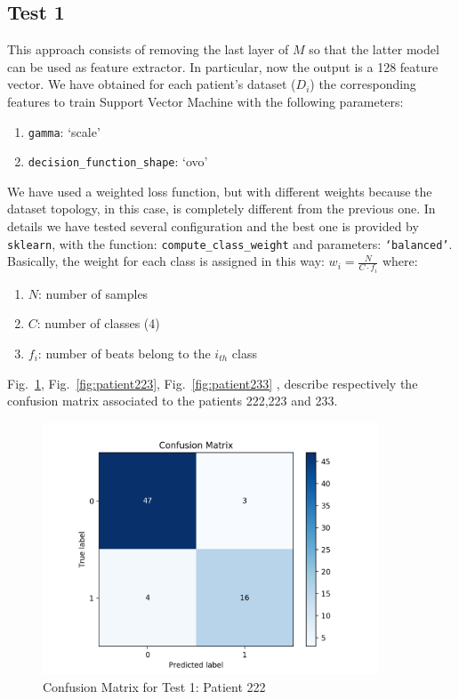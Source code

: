 \documentclass[LaM,binding=0.6cm]{sapthesis}
\begin{document}
\subsection{Test 1}
This approach consists of removing the last layer of $M$ so that the latter model can be used as  feature extractor. In particular, now the output is a 128 feature vector. We have obtained for each patient's dataset ($D_i$) the corresponding features to train Support Vector Machine with the following parameters:
\begin{enumerate}
\item \texttt{gamma}: `scale'
\item \texttt{decision\_function\_shape}: `ovo'
\end{enumerate}
We have used a weighted loss function, but with different weights because the dataset topology, in this case, is completely different from the previous one. In details we have tested several configuration and the best one is provided by \texttt{sklearn}, with the function: \texttt{compute\_class\_weight} and parameters: \texttt{`balanced'}. Basically, the weight for each class is assigned in this way: $w_i = \frac{N}{C\cdot f_i}$ where:
\begin{enumerate}
\item $N$: number of samples
\item $C$: number of classes (4)
\item $f_i$: number of beats belong to the $i_{th}$ class
\end{enumerate}
Fig.~\ref{fig:patient222}, Fig.~\ref{fig:patient223}, Fig.~\ref{fig:patient233} , describe respectively the confusion matrix associated to the patients 222,223 and 233.
\begin{figure}  \centering
    \includegraphics[width=100mm,scale=0.7]{patient222}
    \caption{Confusion Matrix for Test 1: Patient 222 }
    \label{fig:patient222}
\end{figure}
\end{document}

